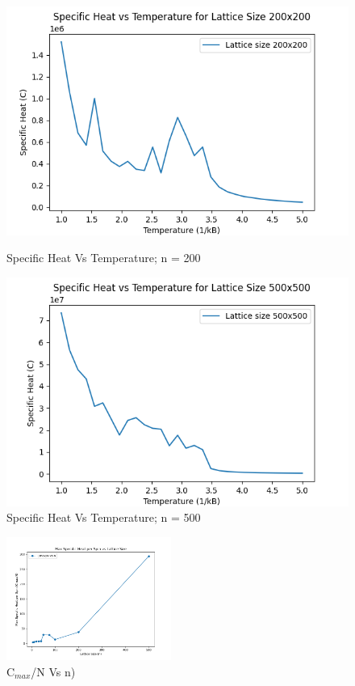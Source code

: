 \documentclass[11pt]{article}
\begin{document}
\begin{figure}[H]
    \centering
    \begin{minipage}{0.48\textwidth}
        \centering
        \includegraphics[width=\textwidth]{Specific_Heat_vs_Temperature_n200.png}
        \caption{Specific Heat Vs Temperature; n = 200}
        \label{fig:29}
    \end{minipage}\hfill %
    \begin{minipage}{0.48\textwidth}
        \centering
        \includegraphics[width=\textwidth]{Specific_Heat_vs_Temperature_n500.png}
        \caption{Specific Heat Vs Temperature; n = 500}
        \label{fig:30}
    \end{minipage}
\end{figure}

\begin{figure}[H]
    \centering
    \includegraphics[width=0.48\textwidth, keepaspectratio]{Max_Specific_Heat_per_Spin_vs_Lattice_Size.png}
    \caption{C$_{max}$/N Vs n)}
    \label{fig:31}
\end{figure}
\end{document}
